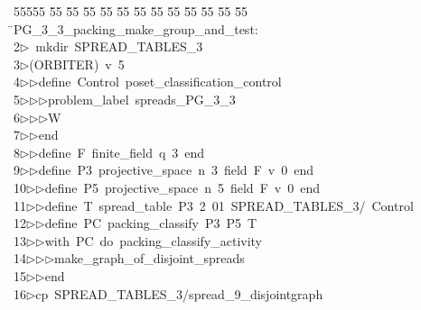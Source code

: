 %
%
\begin{tabbing}
55555 \= 55 \= 55 \= 55 \= 55 \= 55 \= 55 \= 55 \= 55 \= 55 \= 55 \= 55 \= 55 \= \>PG\_3\_3\_packing\_make\_group\_and\_test:\\[0pt]
2\>$\triangleright$\>\ mkdir\ SPREAD\_TABLES\_3\\[0pt]
3\>$\triangleright$\>(ORBITER)\ v\ 5\ \\[0pt]
4\>$\triangleright$\>$\triangleright$\>define\ Control\ poset\_classification\_control\ \\[0pt]
5\>$\triangleright$\>$\triangleright$\>$\triangleright$\>problem\_label\ spreads\_PG\_3\_3\ \\[0pt]
6\>$\triangleright$\>$\triangleright$\>$\triangleright$\>W\ \\[0pt]
7\>$\triangleright$\>$\triangleright$\>end\ \\[0pt]
8\>$\triangleright$\>$\triangleright$\>define\ F\ finite\_field\ q\ 3\ end\ \\[0pt]
9\>$\triangleright$\>$\triangleright$\>define\ P3\ projective\_space\ n\ 3\ field\ F\ v\ 0\ end\ \\[0pt]
10\>$\triangleright$\>$\triangleright$\>define\ P5\ projective\_space\ n\ 5\ field\ F\ v\ 0\ end\ \\[0pt]
11\>$\triangleright$\>$\triangleright$\>define\ T\ spread\_table\ P3\ 2\ 01\ SPREAD\_TABLES\_3/\ Control\\[0pt]
12\>$\triangleright$\>$\triangleright$\>define\ PC\ packing\_classify\ P3\ P5\ T\ \\[0pt]
13\>$\triangleright$\>$\triangleright$\>with\ PC\ do\ packing\_classify\_activity\ \\[0pt]
14\>$\triangleright$\>$\triangleright$\>$\triangleright$\>make\_graph\_of\_disjoint\_spreads\ \\[0pt]
15\>$\triangleright$\>$\triangleright$\>end\\[0pt]
16\>$\triangleright$\>cp\ SPREAD\_TABLES\_3/spread\_9\_disjointgraph\ \\[0pt]

\end{tabbing}
